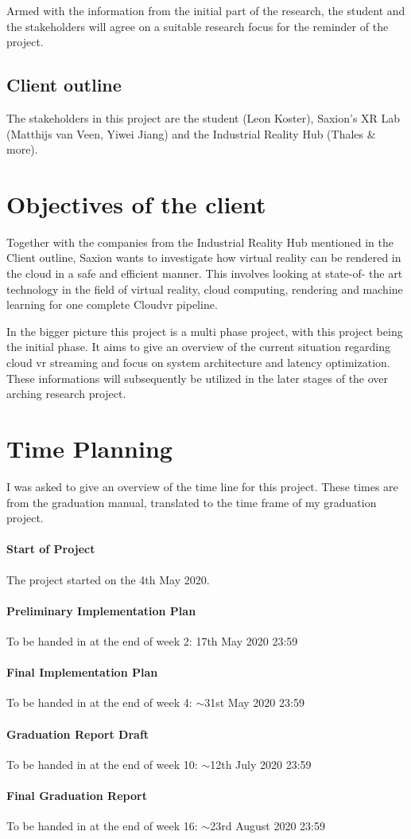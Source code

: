 \documentclass[]{article}
\begin{document}
Armed with the information from the initial part of the research, the student and the stakeholders will agree on a suitable research focus for the reminder of the project.
\subsection{Client outline}
The stakeholders in this project are the student (Leon Koster), Saxion's XR Lab (Matthijs van Veen, Yiwei Jiang) and the Industrial Reality Hub (Thales \& more).
\section{Objectives of the client}
Together with the companies from the Industrial Reality Hub mentioned in the Client outline, Saxion wants to investigate how virtual reality can be rendered in the cloud in a safe and efficient manner. This involves looking at state-of-
the art technology in the field of virtual reality, cloud computing, rendering and machine learning for one
complete Cloud\acrshort{vr} pipeline. 

In the bigger picture this project is a multi phase project, with this project being the initial phase. It aims to give an overview of the current situation regarding cloud \acrshort{vr} streaming and focus on system architecture and latency optimization. These informations will subsequently be utilized in the later stages of the over arching research project.

\section{Time Planning}
I was asked to give an overview of the time line for this project. These times are from the graduation manual, translated to the time frame of my graduation project. 
\paragraph{Start of Project}
The project started on the 4th May 2020.
\paragraph{Preliminary Implementation Plan}
To be handed in at the end of week 2: 17th May 2020 23:59
\paragraph{Final Implementation Plan}
To be handed in at the end of week 4: $\sim$31st May 2020 23:59
\paragraph{Graduation Report Draft}
To be handed in at the end of week 10: $\sim$12th July 2020 23:59
\paragraph{Final Graduation Report}
To be handed in at the end of week 16: $\sim$23rd August 2020 23:59
\end{document}
